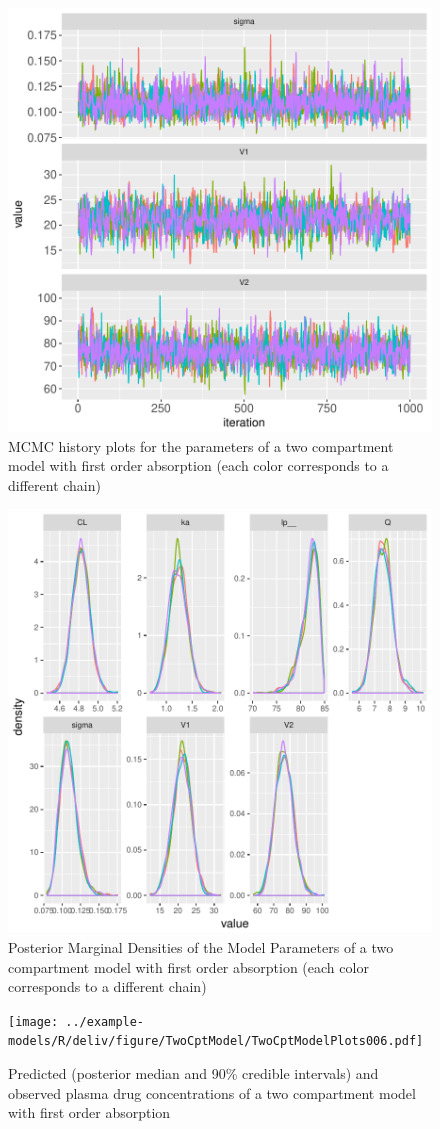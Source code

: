 \documentclass[11pt, reqno, oneside]{amsbook}
\numberwithin{equation}{chapter}
\numberwithin{figure}{chapter}
\numberwithin{table}{chapter}
\theoremstyle{remark}
\begin{document}
\begin{figure}[htbp]
\centering
\includegraphics[width=0.6\linewidth]{../example-models/R/deliv/figure/TwoCptModel/TwoCptModelPlots002.pdf}
\caption{\label{fig:org9f2dd93}
MCMC history plots for the parameters of a two compartment model with first order absorption (each color corresponds to a different chain)}
\end{figure}

\begin{figure}[htbp]
\centering
\includegraphics[width=0.6\linewidth]{../example-models/R/deliv/figure/TwoCptModel/TwoCptModelPlots003.pdf}
\caption{\label{fig:orgdd7f9a0}
Posterior Marginal Densities of the Model Parameters of a two compartment model with first order absorption (each color corresponds to a different chain)}
\end{figure}

\begin{figure}[htbp]
\centering
\texttt{[image: ../example-models/R/deliv/figure/TwoCptModel/TwoCptModelPlots006.pdf]}
\caption{\label{fig:orgc100d20}
Predicted (posterior median and 90\% credible intervals) and observed plasma drug concentrations of a two compartment model with first order absorption}
\end{figure}
\end{document}
